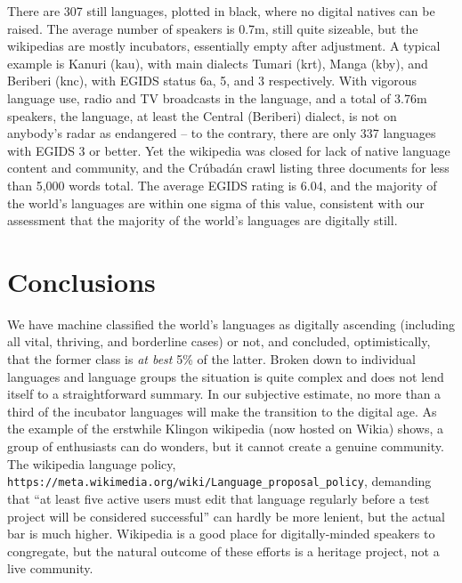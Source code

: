 \documentclass[10pt]{article}
\begin{document}
There are 307 still languages, plotted in black, where no digital
natives can be raised. The average number of speakers is 0.7m, still quite
sizeable, but the wikipedias are mostly incubators, essentially empty after
adjustment. A typical example is Kanuri (kau), with main dialects Tumari
(krt), Manga (kby), and Beriberi (knc), with EGIDS status 6a, 5, and 3
respectively. With vigorous language use, radio and TV broadcasts in the
language, and a total of 3.76m speakers, the language, at least the Central
(Beriberi) dialect, is not on anybody's radar as endangered -- to the
contrary, there are only 337 languages with EGIDS 3 or better. Yet the
wikipedia was closed for lack of native language content and community, and
the Cr\'ubad\'an crawl listing three documents for less than 5,000 words
total. The average EGIDS rating is 6.04, and the majority of the world's
languages are within one sigma of this value, consistent with our assessment
that the majority of the world's languages are digitally still.



\section*{Conclusions}

{\color{black} We have machine classified the world's languages as digitally
  ascending (including all vital, thriving, and borderline cases) or not, and
  concluded, optimistically, that the former class is {\it at best} 5\% of the
  latter. Broken down to individual languages and language groups t}he
situation is quite complex and does not lend itself to a straightforward
summary.  In our {\color{black} subjective} estimate, no more than a third of the
incubator languages will make the transition to the digital age. As the
example of the erstwhile Klingon wikipedia (now hosted on Wikia) shows, a
group of enthusiasts can do wonders, but it cannot create a genuine
community. The wikipedia language policy, {\tt
  https://meta.wikimedia.org/wiki/Language\_proposal\_policy}, demanding that
``at least five active users must edit that language regularly before a test
project will be considered successful'' can hardly be more lenient, but the
actual bar is much higher. Wikipedia is a good place for digitally-minded
speakers to congregate, but the natural outcome of these efforts is a heritage
project, not a live community.
\end{document}
